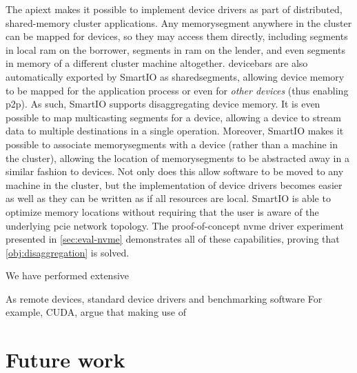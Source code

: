 %
The \gls{apiext} makes it possible to implement device drivers as part of distributed, shared-memory cluster applications. 
%
Any \gls{memorysegment} anywhere in the cluster can be mapped for devices, so they may access them directly, including \glspl{segment} in local \gls{ram} on the \gls{borrower}, \glspl{segment} in \gls{ram} on the \gls{lender}, and even \glspl{segment} in memory of a different cluster machine altogether.
%
\Glspl{devicebar} are also automatically exported by SmartIO as \glspl{sharedsegment}, allowing device memory to be mapped for the application process or even for \emph{other devices} (thus enabling \gls{p2p}).
%
As such, SmartIO supports \gls{disaggregating} device memory.
%
It is even possible to map \gls{multicasting} \glspl{segment} for a device, allowing a device to stream data to multiple destinations in a single operation.
%
Moreover, SmartIO makes it possible to associate \glspl{memorysegment} with a device (rather than a machine in the cluster), allowing the location of \glspl{memorysegment} to be abstracted away in a similar fashion to devices.
%
Not only does this allow software to be moved to any machine in the cluster, but the implementation of device drivers becomes easier as well as they can be written as if all resources are local.
%
SmartIO is able to optimize memory locations without requiring that the user is aware of the underlying \gls{pcie} network topology.
%
The proof-of-concept \gls{nvme} driver experiment presented in \cref{sec:eval-nvme} demonstrates all of these capabilities, proving that \cref*{obj:disaggregation} is solved.



\objexperiments*%
%
We have performed extensive 

As remote devices, standard device drivers and benchmarking software
For example, CUDA, argue that making use of 





\section{Future work}\label{sec:fw}
%
%

